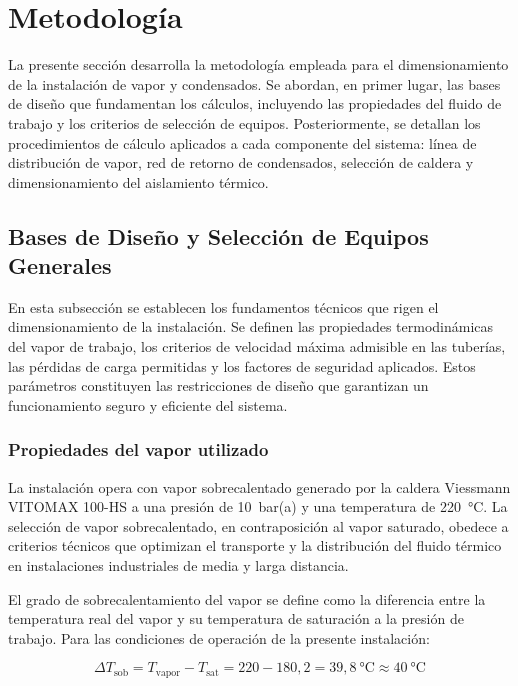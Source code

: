 \documentclass[12pt]{article}
\begin{document}
\section{Metodología}
\label{sec:metodologia}

La presente sección desarrolla la metodología empleada para el dimensionamiento de la instalación de vapor y condensados. Se abordan, en primer lugar, las bases de diseño que fundamentan los cálculos, incluyendo las propiedades del fluido de trabajo y los criterios de selección de equipos. Posteriormente, se detallan los procedimientos de cálculo aplicados a cada componente del sistema: línea de distribución de vapor, red de retorno de condensados, selección de caldera y dimensionamiento del aislamiento térmico.

\subsection{Bases de Diseño y Selección de Equipos Generales}
\label{subsec:bases-diseno}

En esta subsección se establecen los fundamentos técnicos que rigen el dimensionamiento de la instalación. Se definen las propiedades termodinámicas del vapor de trabajo, los criterios de velocidad máxima admisible en las tuberías, las pérdidas de carga permitidas y los factores de seguridad aplicados. Estos parámetros constituyen las restricciones de diseño que garantizan un funcionamiento seguro y eficiente del sistema.

\subsubsection{Propiedades del vapor utilizado}
\label{subsubsec:propiedades-vapor}

La instalación opera con vapor sobrecalentado generado por la caldera Viessmann VITOMAX 100-HS a una presión de 10~bar(a) y una temperatura de 220~°C. La selección de vapor sobrecalentado, en contraposición al vapor saturado, obedece a criterios técnicos que optimizan el transporte y la distribución del fluido térmico en instalaciones industriales de media y larga distancia.

El grado de sobrecalentamiento del vapor se define como la diferencia entre la temperatura real del vapor y su temperatura de saturación a la presión de trabajo. Para las condiciones de operación de la presente instalación:

\begin{equation}
	\Delta T_{\text{sob}} = T_{\text{vapor}} - T_{\text{sat}} = 220 - 180{,}2 = 39{,}8 \ \text{°C} \approx 40 \ \text{°C}
	\label{eq:grado-sobrecalentamiento}
\end{equation}
\end{document}

